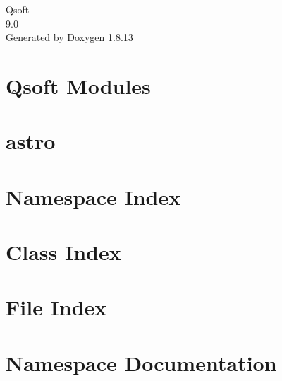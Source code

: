 \documentclass[twoside]{book}
\newcommand{\+}{\discretionary{\mbox{\scriptsize$\hookleftarrow$}}{}{}}
\newcommand{\clearemptydoublepage}{%
  \newpage{\pagestyle{empty}\cleardoublepage}%
}
\begin{document}
\hypersetup{pageanchor=false,
             bookmarksnumbered=true,
             pdfencoding=unicode
            }
\begin{titlepage}
\vspace*{7cm}
\begin{center}%
{\Large Qsoft \\[1ex]\large 9.\+0 }\\
\vspace*{1cm}
{\large Generated by Doxygen 1.8.13}\\
\end{center}
\end{titlepage}
\clearemptydoublepage
{}
\tableofcontents
\clearemptydoublepage
{}
\hypersetup{pageanchor=true}

\chapter{Qsoft Modules}
\label{index}\hypertarget{index}{}
\chapter{astro}
\label{md_astro_astro}

\chapter{Namespace Index}

\chapter{Class Index}

\chapter{File Index}

\chapter{Namespace Documentation}









\end{document}

